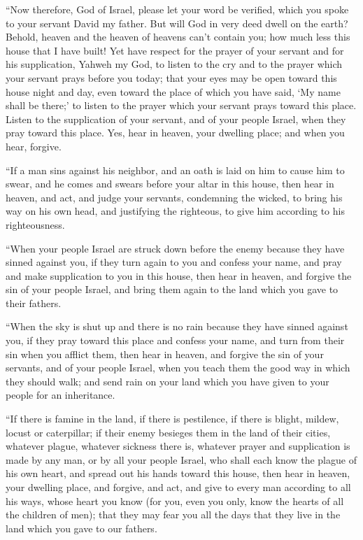  ``Now therefore, God of Israel, please let your word be
verified, which you spoke to your servant David my father. 
But will God in very deed dwell on the earth? Behold, heaven and the
heaven of heavens can't contain you; how much less this house that I
have built!  Yet have respect for the prayer of your
servant and for his supplication, Yahweh my God, to listen to the cry
and to the prayer which your servant prays before you today;
 that your eyes may be open toward this house night and
day, even toward the place of which you have said, `My name shall be
there;' to listen to the prayer which your servant prays toward this
place.  Listen to the supplication of your servant, and of
your people Israel, when they pray toward this place. Yes, hear in
heaven, your dwelling place; and when you hear, forgive.

 ``If a man sins against his neighbor, and an oath is laid
on him to cause him to swear, and he comes and swears before your altar
in this house,  then hear in heaven, and act, and judge
your servants, condemning the wicked, to bring his way on his own head,
and justifying the righteous, to give him according to his
righteousness.

 ``When your people Israel are struck down before the enemy
because they have sinned against you, if they turn again to you and
confess your name, and pray and make supplication to you in this house,
 then hear in heaven, and forgive the sin of your people
Israel, and bring them again to the land which you gave to their
fathers.

 ``When the sky is shut up and there is no rain because
they have sinned against you, if they pray toward this place and confess
your name, and turn from their sin when you afflict them, 
then hear in heaven, and forgive the sin of your servants, and of your
people Israel, when you teach them the good way in which they should
walk; and send rain on your land which you have given to your people for
an inheritance.

 ``If there is famine in the land, if there is pestilence,
if there is blight, mildew, locust or caterpillar; if their enemy
besieges them in the land of their cities, whatever plague, whatever
sickness there is,  whatever prayer and supplication is
made by any man, or by all your people Israel, who shall each know the
plague of his own heart, and spread out his hands toward this house,
 then hear in heaven, your dwelling place, and forgive, and
act, and give to every man according to all his ways, whose heart you
know (for you, even you only, know the hearts of all the children of
men);  that they may fear you all the days that they live
in the land which you gave to our fathers.

